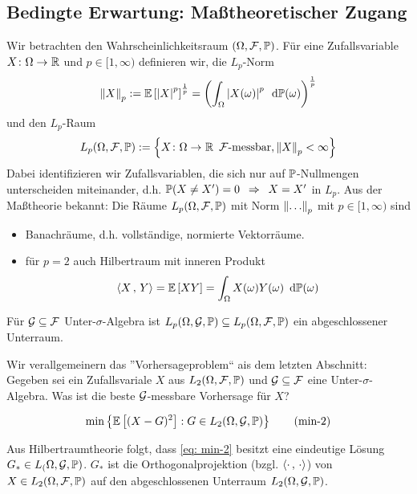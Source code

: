 \subsection{Bedingte Erwartung: Maßtheoretischer Zugang}

Wir betrachten den Wahrscheinlichkeitsraum $(\Omega, \F, \P)$. Für eine Zufallsvariable $\abb{X}{\Omega}{\R}$ und $p \in [1,\infty)$ definieren wir, die $L_p$-Norm
\begin{equation*}
\norm{X}_p \defeq \EW[\abs{X}^p]^{\frac{1}{p}} = \brackets{\int_\Omega \abs{X(\omega)}^p \diffskip{\P(\omega)}}^\frac{1}{p}
\end{equation*}
und den $L_p$-Raum
\begin{equation*}
L_p(\Omega, \F, \P) \defeq \menge{\abb{X}{\Omega}{\R} \enskip \F\text{-messbar}, \norm{X}_p < \infty}
\end{equation*}
Dabei identifizieren wir Zufallsvariablen, die sich nur auf $\P$-Nullmengen unterscheiden miteinander, d.h. $\P(X \neq X') = 0 \follows X = X'$ in $L_p$. Aus der Maßtheorie bekannt: Die Räume $L_p(\Omega,\F,\P)$ mit Norm $\norm{\dots}_p$ mit $p \in [1,\infty)$ sind
\begin{itemize}
	\item Banachräume, d.h. vollständige, normierte Vektorräume.
	\item für $p=2$ auch Hilbertraum mit inneren Produkt 
	\begin{equation*}
	\scal{X}{Y} = \EW[XY] = \int_\Omega X(\omega) Y(\omega) \diffskip{\P(\omega)}
	\end{equation*}
\end{itemize}

Für $\G \subseteq \F$ Unter-$\sigma$-Algebra ist $L_p(\Omega,\G,\P) \subseteq L_p(\Omega, \F, \P)$ ein abgeschlossener Unterraum.

Wir verallgemeinern das ''Vorhersageproblem`` ais dem letzten Abschnitt: Gegeben sei ein Zufallsvariale $X$ aus $L_2(\Omega,\F,\P)$ und $\G \subseteq \F$ eine Unter-$\sigma$-Algebra. Was ist die beste $\G$-messbare Vorhersage für $X$?

\begin{equation}
\min\menge{\EW[(X-G)^2] : G \in L_2(\Omega,\G,\P)} \tag{min-2} \label{eq: min-2}
\end{equation}

Aus Hilbertraumtheorie folgt, dass \eqref{eq: min-2} besitzt eine eindeutige Lösung $G_\ast \in L_(\Omega, \G, \P)$. $G_\ast$ ist die Orthogonalprojektion (bzgl. $\scal{\cdot}{\cdot}$) von $X \in L_2(\Omega,\F,\P)$ auf den abgeschlossenen Unterraum $L_2(\Omega,\G,\P)$.

